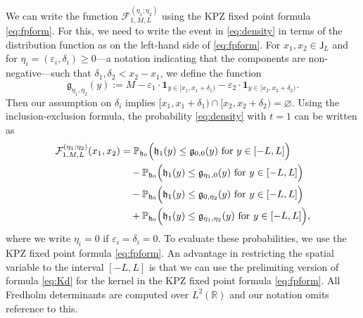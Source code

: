 \documentclass[oneside,final,11pt]{amsart}
\theoremstyle{definition}
\newcounter{assum}
\newcommand{\fh}{\mathfrak{h}}
\newcommand{\fg}{\mathfrak{g}}
\newcommand{\bJ}{\mathsf{J}}
\newcommand{\R}{\mathbb{R}}
\newcommand{\dens}{\CF}
\newcommand{\1}[1]{\mathbf{1}_{#1}}
\newcommand{\eps}{\varepsilon}
\newcommand{\fx}{x}
\newcommand{\fM}{M}
\newcommand{\CF}{\mathcal{F}}
\renewcommand{\P}{\mathbb P}
\let\emptyset\varnothing
\numberwithin{equation}{section}
\begin{document}
We can write the function $\dens^{(\eta_1; \eta_2)}_{1, M, L}$ using the KPZ fixed point formula \eqref{eq:fpform}. For this, we need to write the event in \eqref{eq:density} in terms of the distribution function as on the left-hand side of \eqref{eq:fpform}. For $x_1, x_2 \in \bJ_L$ and for $\eta_i = (\eps_i, \delta_i) \geq 0$---a notation indicating that the components are non-negative---such that $\delta_1, \delta_2 < x_2 - x_1$, we define the function
\begin{equation}\label{eq:g_def}
 \fg_{\eta_1, \eta_2}(y) := \fM - \eps_1 \cdot \1{y \in [\fx_1, \fx_1 + \delta_1)} - \eps_2 \cdot \1{y \in [\fx_2, \fx_2 + \delta_2)}.
\end{equation}
Then our assumption on $\delta_i$ implies $[\fx_1, \fx_1 + \delta_1) \cap [\fx_2, \fx_2 + \delta_2) = \emptyset$. Using the inclusion-exclusion formula, the probability \eqref{eq:density} with $t = 1$ can be written as
%
\begin{equation}
\begin{split}
\dens_{1, \fM, L}^{(\eta_1; \eta_2)}(\fx_1, \fx_2) 
&=\P_{\fh_0}\Bigl( \fh_1(y) \leq \fg_{0, 0}(y) \text{ for } y \in [-L, L] \Bigr)\\
&\quad- \P_{\fh_0}\Bigl( \fh_1(y) \leq \fg_{\eta_1, 0}(y) \text{ for } y \in [-L, L] \Bigr)\\
&\quad- \P_{\fh_0}\Bigl( \fh_1(y) \leq \fg_{0, \eta_2}(y) \text{ for } y \in [-L, L] \Bigr)\\
&\quad+ \P_{\fh_0}\Bigl( \fh_1(y) \leq \fg_{\eta_1, \eta_2}(y) \text{ for } y \in [-L, L] \Bigr),
\end{split}\label{eq:density_approx}
\end{equation}
%
where we write $\eta_i = 0$ if $\eps_i = \delta_i = 0$.
To evaluate these probabilities, we use the KPZ fixed point formula \eqref{eq:fpform}. An advantage in restricting the spatial variable to the interval $[-L, L]$ is that we can use the prelimiting version of formula \eqref{eq:Kd} for the kernel in the KPZ fixed point formula \eqref{eq:fpform}. All Fredholm determinants are computed over $L^2(\R)$ and our notation omits reference to this.
\end{document}
